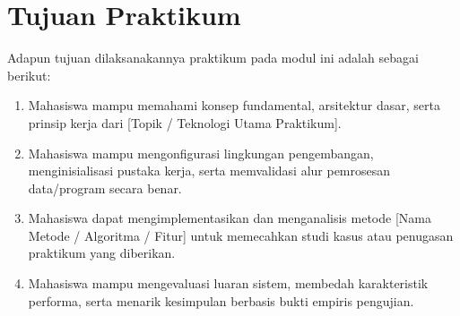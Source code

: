 
\chapter{Tujuan Praktikum}
\label{chap:tujuanpraktikum}

Adapun tujuan dilaksanakannya praktikum pada modul ini adalah sebagai berikut:

\begin{enumerate}
    \item Mahasiswa mampu memahami konsep fundamental, arsitektur dasar, serta prinsip kerja dari [Topik / Teknologi Utama Praktikum].
    \item Mahasiswa mampu mengonfigurasi lingkungan pengembangan, menginisialisasi pustaka kerja, serta memvalidasi alur pemrosesan data/program secara benar.
    \item Mahasiswa dapat mengimplementasikan dan menganalisis metode [Nama Metode / Algoritma / Fitur] untuk memecahkan studi kasus atau penugasan praktikum yang diberikan.
    \item Mahasiswa mampu mengevaluasi luaran sistem, membedah karakteristik performa, serta menarik kesimpulan berbasis bukti empiris pengujian.
\end{enumerate}
